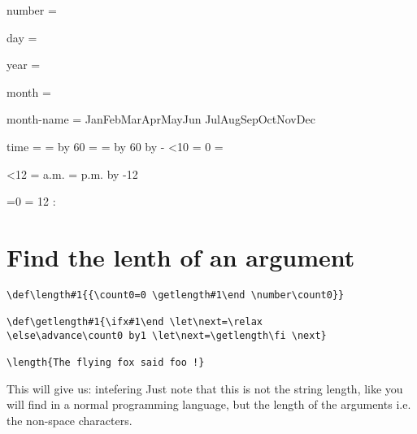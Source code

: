 \begin{comment}
Typing \texttt{\string\weekday\{12\}} will give you an error: 

 \weekday{12} \sidenote{Not a real error, but we need to start thinking as to how to catch errors!}\sidenote{\jobname, ~ \today }
\end{comment}

\begin{teX}
\def\monthname{%
\ifcase\month
\or Jan\or Feb\or Mar\or Apr\or May\or Jun%
\or Jul\or Aug\or Sep\or Oct\or Nov\or Dec%
\fi}%
\def\timestring{\begingroup
\count0 = \time \divide\count0 by 60
\count2 = \count0 %
\count4 = \time \multiply\count0 by 60
\advance\count4 by -\count0 %
\ifnum\count4<10 \toks1 = {0}%
\else \toks1 = {}%
\fi

\ifnum\count2<12 \toks0 = {a.m.}%
\else \toks0 = {p.m.}%
\advance\count2 by -12
\fi

\ifnum\count2=0 \count2 = 12 \fi 
\number\count2:\the\toks1 \number\count4
\thinspace \the\toks0
\endgroup}%

\def\timestamp{\number\day\space\monthname\space
\number\year\quad\timestring}%

number = \number

day = \day 

year =\year

month = \month

month-name  = \monthname 8

time = \timestring
\end{teX}

\section{Find the lenth of an argument}

\begin{verbatim}
\def\length#1{{\count0=0 \getlength#1\end \number\count0}}

\def\getlength#1{\ifx#1\end \let\next=\relax
\else\advance\count0 by1 \let\next=\getlength\fi \next}

\length{The flying fox said foo !}
\end{verbatim}


This will give us:  \TODO intefering  Just note that this is not the string length, like you will find in a normal programming language, but the length of the arguments i.e. the non-space characters.

